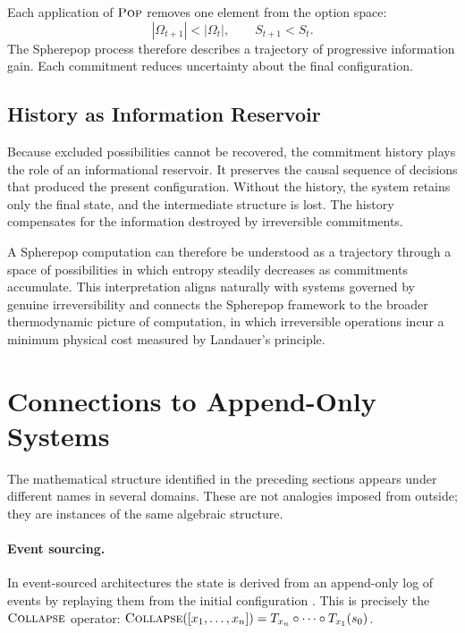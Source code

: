 \documentclass[12pt]{article}
\newcommand{\Pop}{\operatorname{\textsc{Pop}}}
\newcommand{\Collapse}{\operatorname{\textsc{Collapse}}}
\newcommand{\Option}{\Omega}
\newcommand{\Seq}[1]{\left[#1\right]}
\begin{document}
Each application of $\Pop$ removes one element from the option space:
\[
|\Option_{t+1}| < |\Option_t|, \qquad S_{t+1} < S_t.
\]
The Spherepop process therefore describes a trajectory of progressive information gain. Each commitment reduces uncertainty about the final configuration.

\subsection{History as Information Reservoir}

Because excluded possibilities cannot be recovered, the commitment history plays the role of an informational reservoir. It preserves the causal sequence of decisions that produced the present configuration. Without the history, the system retains only the final state, and the intermediate structure is lost. The history compensates for the information destroyed by irreversible commitments.

A Spherepop computation can therefore be understood as a trajectory through a space of possibilities in which entropy steadily decreases as commitments accumulate. This interpretation aligns naturally with systems governed by genuine irreversibility and connects the Spherepop framework to the broader thermodynamic picture of computation, in which irreversible operations incur a minimum physical cost measured by Landauer's principle.

\section{Connections to Append-Only Systems}
\label{sec:connections}

The mathematical structure identified in the preceding sections appears under different names in several domains. These are not analogies imposed from outside; they are instances of the same algebraic structure.

\paragraph{Event sourcing.} In event-sourced architectures the state is derived from an append-only log of events by replaying them from the initial configuration \cite{fowler2005}. This is precisely the $\Collapse$ operator: $\Collapse(\Seq{x_1,\ldots,x_n}) = T_{x_n} \circ \cdots \circ T_{x_1}(s_0)$.
\end{document}

